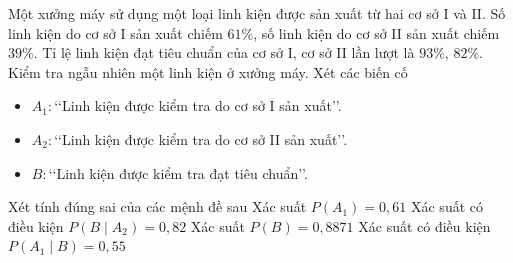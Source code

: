 \begin{ex}%
Một xưởng máy sử dụng một loại linh kiện được sản xuất từ hai cơ sở I và II. Số linh kiện do cơ sở I sản xuất chiếm $61\%$, số linh kiện do cơ sở II sản xuất chiếm $39\%$. Tỉ lệ linh kiện đạt tiêu chuẩn của cơ sở I, cơ sở II lần lượt là $93\%$, $82\%$. Kiểm tra ngẫu nhiên một linh kiện ở xưởng máy. Xét các biến cố
\begin{itemize}
\item $A_1\colon$\lq\lq Linh kiện được kiểm tra do cơ sở I sản xuất\rq\rq.
\item $A_2\colon$\lq\lq Linh kiện được kiểm tra do cơ sở II sản xuất\rq\rq.
\item $B\colon$\lq\lq Linh kiện được kiểm tra đạt tiêu chuẩn\rq\rq.
\end{itemize}
Xét tính đúng sai của các mệnh đề sau
\choiceTF
{\True Xác suất $P(A_1)=0{,}61$}
{\True Xác suất có điều kiện $P(B\mid A_2)=0{,}82$}
{\True Xác suất $P(B)=0{,}8871$}
{Xác suất có điều kiện $P(A_1\mid B)=0{,}55$}
\end{ex}

